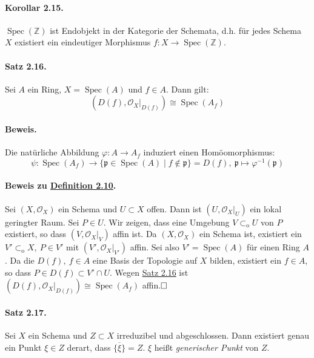 \documentclass[11pt,b5paper,openany]{memoir}
\def \qed {$\hfill\square$}
\def \qedhere {\tag*{$\square$}}
\begin{document}
\paragraph{Korollar 2.15.}\label{2.15} $\operatorname{Spec}(\mathbb{Z})$ ist Endobjekt in der Kategorie der Schemata, d.h. für jedes Schema $X$ existiert ein eindeutiger Morphismus $f:X\to\operatorname{Spec}(\mathbb{Z})$.

\paragraph{Satz 2.16.}\label{2.16} Sei $A$ ein Ring, $X=\operatorname{Spec}(A)$ und $f\in A$. Dann gilt:
\[(D(f),\mathcal{O}_X|_{D(f)})\cong \operatorname{Spec}(A_f) \]

\paragraph{Beweis.} Die natürliche Abbildung $\varphi:A\to A_f$ induziert einen Homöomorphismus:
\[\psi:\operatorname{Spec}(A_f) \to \{\mathfrak{p}\in\operatorname{Spec}(A)\mid f\not\in\mathfrak{p} \}=D(f),\ \mathfrak{p}\mapsto\varphi^{-1}(\mathfrak{p})\qedhere \]

\paragraph{Beweis zu \hyperref[2.10]{Definition 2.10}.}\label{2.10-beweis} Sei $(X,\mathcal{O}_X)$ ein Schema und $U\subset X$ offen. Dann ist $(U,\mathcal{O}_X|_U)$ ein lokal geringter Raum. Sei $P\in U$. Wir zeigen, dass eine Umgebung $V\subset_\text{o} U$ von $P$ existiert, so dass $(V,\mathcal{O}_X|_V)$ affin ist. Da $(X,\mathcal{O}_X)$ ein Schema ist, existiert ein $V'\subset_\text{o}X,\ P\in V'$ mit $(V',\mathcal{O}_X|_{V'})$ affin. Sei also $V'=\operatorname{Spec}(A)$ für einen Ring $A$. Da die $D(f),\ f\in A$ eine Basis der Topologie auf $X$ bilden, existiert ein $f\in A$, so dass $P\in D(f)\subset V'\cap U$. Wegen \hyperref[2.16]{Satz 2.16} ist $(D(f),\mathcal{O}_X|_{D(f)})\cong\operatorname{Spec}(A_f)$ affin.\qed

\paragraph{Satz 2.17.}\label{2.17} Sei $X$ ein Schema und $Z\subset X$ irreduzibel und abgeschlossen. Dann existiert genau ein Punkt $\xi\in Z$ derart, dass $\overline{\{\xi\}}=Z$. $\xi$ heißt \textit{generischer Punkt} von $Z$.
\end{document}
